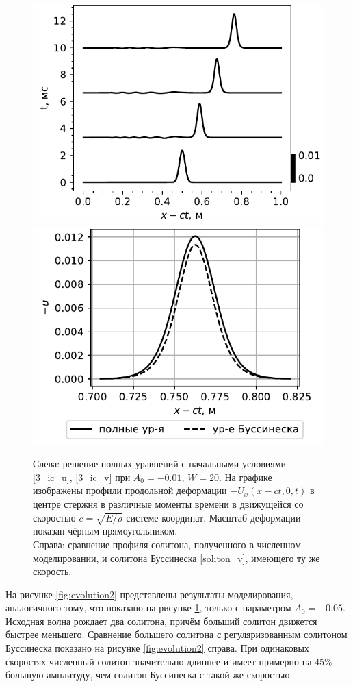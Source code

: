 \documentclass[12pt, a4paper]{report}
\begin{document}
\begin{figure}[h!]
	\centering
	\includegraphics[width=0.48\linewidth]{figures/SolEvolSmall}
	\includegraphics[width=0.48\linewidth]{figures/SolCompareSmall}
	\caption{Слева: решение полных уравнений с начальными условиями \eqref{3_ic_u}, \eqref{3_ic_v} при $A_0=-0.01$, $W=20$. На графике изображены профили продольной деформации $-U_x(x - ct, 0, t)$ в центре стержня в различные моменты времени в движущейся со скоростью $c=\sqrt{E/\rho}$ системе координат. Масштаб деформации показан чёрным прямоугольником. 
	\\
	Справа: сравнение профиля солитона, полученного в численном моделировании, и солитона Буссинеска \eqref{soliton_v}, имеющего ту же скорость.}
	\label{fig:evolution1}
\end{figure}

На рисунке \ref{fig:evolution2} представлены результаты моделирования, аналогичного тому, что показано на рисунке \ref{fig:evolution1}, только с параметром $A_0=-0.05$. Исходная волна рождает два солитона, причём больший солитон движется быстрее меньшего. Сравнение большего солитона с регуляризованным солитоном Буссинеска показано на рисунке \ref{fig:evolution2} справа. При одинаковых скоростях численный солитон значительно длиннее и имеет примерно на 45\% большую амплитуду, чем солитон Буссинеска с такой же скоростью.
\end{document}
